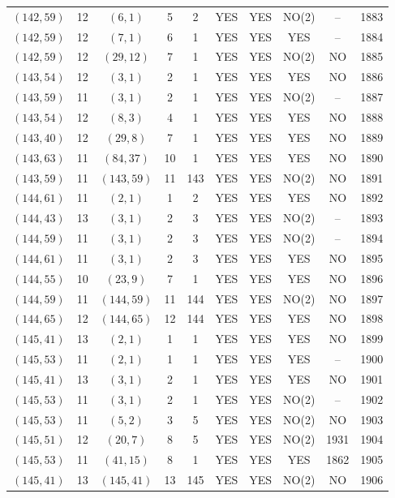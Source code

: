 \begin{longtable}{|c|c|c|c|c|c|c|c|c|c|}
$(142, 59)$ & 12 & $(6, 1)$ & 5 & 2 & YES & YES & NO(2) & -- & 1883\\
$(142, 59)$ & 12 & $(7, 1)$ & 6 & 1 & YES & YES & YES & -- & 1884\\
$(142, 59)$ & 12 & $(29, 12)$ & 7 & 1 & YES & YES & NO(2) & NO & 1885\\
$(143, 54)$ & 12 & $(3, 1)$ & 2 & 1 & YES & YES & YES & NO & 1886\\
$(143, 59)$ & 11 & $(3, 1)$ & 2 & 1 & YES & YES & NO(2) & -- & 1887\\
$(143, 54)$ & 12 & $(8, 3)$ & 4 & 1 & YES & YES & YES & NO & 1888\\
$(143, 40)$ & 12 & $(29, 8)$ & 7 & 1 & YES & YES & YES & NO & 1889\\
$(143, 63)$ & 11 & $(84, 37)$ & 10 & 1 & YES & YES & YES & NO & 1890\\
$(143, 59)$ & 11 & $(143, 59)$ & 11 & 143 & YES & YES & NO(2) & NO & 1891\\
$(144, 61)$ & 11 & $(2, 1)$ & 1 & 2 & YES & YES & YES & NO & 1892\\
$(144, 43)$ & 13 & $(3, 1)$ & 2 & 3 & YES & YES & NO(2) & -- & 1893\\
$(144, 59)$ & 11 & $(3, 1)$ & 2 & 3 & YES & YES & NO(2) & -- & 1894\\
$(144, 61)$ & 11 & $(3, 1)$ & 2 & 3 & YES & YES & YES & NO & 1895\\
$(144, 55)$ & 10 & $(23, 9)$ & 7 & 1 & YES & YES & YES & NO & 1896\\
$(144, 59)$ & 11 & $(144, 59)$ & 11 & 144 & YES & YES & NO(2) & NO & 1897\\
$(144, 65)$ & 12 & $(144, 65)$ & 12 & 144 & YES & YES & YES & NO & 1898\\
$(145, 41)$ & 13 & $(2, 1)$ & 1 & 1 & YES & YES & YES & NO & 1899\\
$(145, 53)$ & 11 & $(2, 1)$ & 1 & 1 & YES & YES & YES & -- & 1900\\
$(145, 41)$ & 13 & $(3, 1)$ & 2 & 1 & YES & YES & YES & NO & 1901\\
$(145, 53)$ & 11 & $(3, 1)$ & 2 & 1 & YES & YES & NO(2) & -- & 1902\\
$(145, 53)$ & 11 & $(5, 2)$ & 3 & 5 & YES & YES & NO(2) & NO & 1903\\
$(145, 51)$ & 12 & $(20, 7)$ & 8 & 5 & YES & YES & NO(2) & 1931 & 1904\\
$(145, 53)$ & 11 & $(41, 15)$ & 8 & 1 & YES & YES & YES & 1862 & 1905\\
$(145, 41)$ & 13 & $(145, 41)$ & 13 & 145 & YES & YES & NO(2) & NO & 1906\\

\end{longtable}
